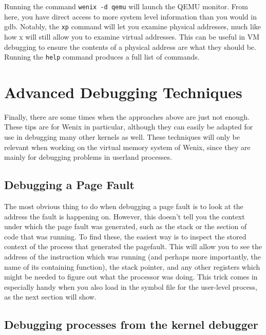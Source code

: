 Running the command \texttt{wenix -d qemu} will launch the QEMU monitor. From here, you have direct access to more system level information than you would in gdb. Notably, the \texttt{xp} command will let you examine physical addresses, much like how x will still allow you to examine virtual addresses. This can be useful in VM debugging to ensure the contents of a physical address are what they should be. Running the \texttt{help} command produces a full list of commands.

\section{Advanced Debugging Techniques}
Finally, there are some times when the approaches above are just not enough. These tips are for Wenix in particular, although they can easily be adapted for use in debugging many other kernels as well. These techniques will only be relevant when working on the virtual memory system of Wenix, since they are mainly for debugging problems in userland processes.

\subsection{Debugging a Page Fault}

The most obvious thing to do when debugging a page fault is to look at the address the fault is happening on. However, this doesn't tell you the context under which the page fault was generated, such as the stack or the section of code that was running. To find these, the easiest way is to inspect the stored context of the process that generated the pagefault. This will allow you to see the address of the instruction which was running (and perhaps more importantly, the name of its containing function), the stack pointer, and any other registers which might be needed to figure out what the processor was doing. This trick comes in especially handy when you also load in the symbol file for the user-level process, as the next section will show.

\subsection{Debugging processes from the kernel debugger}

